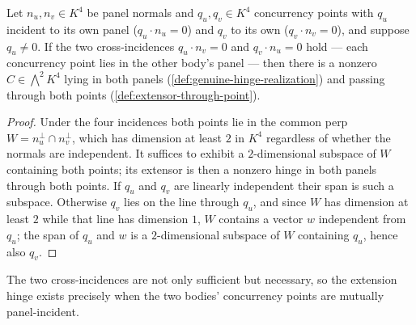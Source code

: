 \begin{lemma}
  \label{lem:two-pencil-extension}
  \leanok
  Let $n_u, n_v \in K^4$ be panel normals and $q_u, q_v \in K^4$
  concurrency points with $q_u$ incident to its own panel
  ($q_u \cdot n_u = 0$) and $q_v$ to its own ($q_v \cdot n_v = 0$),
  and suppose $q_u \ne 0$. If the two cross-incidences
  $q_u \cdot n_v = 0$ and $q_v \cdot n_u = 0$ hold --- each
  concurrency point lies in the other body's panel --- then there is a
  nonzero $C \in \bigwedge^{2} K^{4}$ lying in both panels
  (\cref{def:genuine-hinge-realization}) and passing through both points
  (\cref{def:extensor-through-point}).
\end{lemma}
\begin{proof}
  \leanok
  Under the four incidences both points lie in the common perp
  $W = n_u^{\perp} \cap n_v^{\perp}$, which has dimension at least $2$
  in $K^4$ regardless of whether the normals are independent. It
  suffices to exhibit a $2$-dimensional subspace of $W$ containing both
  points; its extensor is then a nonzero hinge in both panels through
  both points. If $q_u$ and $q_v$ are linearly independent their span
  is such a subspace. Otherwise $q_v$ lies on the line through $q_u$,
  and since $W$ has dimension at least $2$ while that line has dimension
  $1$, $W$ contains a vector $w$ independent from $q_u$; the span of
  $q_u$ and $w$ is a $2$-dimensional subspace of $W$ containing $q_u$,
  hence also $q_v$.
\end{proof}

The two cross-incidences are not only sufficient but necessary, so the
extension hinge exists precisely when the two bodies' concurrency points
are mutually panel-incident.

